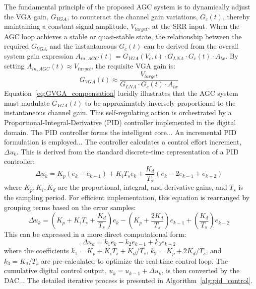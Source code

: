 \documentclass[journal]{IEEEtran}
\begin{document}
The fundamental principle of the proposed AGC system is to dynamically adjust the VGA gain, $G_{VGA}$, to counteract the channel gain variations, $G_c(t)$, thereby maintaining a constant signal amplitude, $V_{target}$, at the SRR input. When the AGC loop achieves a stable or quasi-stable state, the relationship between the required $G_{VGA}$ and the instantaneous $G_c(t)$ can be derived from the overall system gain expression $A_{in,AGC}(t) = G_{VGA}(V_c,t) \cdot G_{LNA} \cdot G_c(t) \cdot A_{tx}$. By setting $A_{in,AGC}(t) \approx V_{target}$, the requisite VGA gain is:
\begin{equation}
    G_{VGA}(t) \approx \frac{V_{target}}{G_{LNA} \cdot G_c(t) \cdot A_{tx}}
    \label{eq:GVGA_compensation}
\end{equation}
Equation~\eqref{eq:GVGA_compensation} lucidly illustrates that the AGC system must modulate $G_{VGA}(t)$ to be approximately inversely proportional to the instantaneous channel gain. This self-regulating action is orchestrated by a Proportional-Integral-Derivative (PID) controller implemented in the digital domain.
The PID controller forms the intelligent core... An incremental PID formulation is employed... The controller calculates a control effort increment, $\Delta u_k$. This is derived from the standard discrete-time representation of a PID controller:
\begin{equation}
    \Delta u_k = K_p (e_k - e_{k-1}) + K_i T_s e_k + \frac{K_d}{T_s} (e_k - 2e_{k-1} + e_{k-2})
    \label{eq:PID_standard_discrete}
\end{equation}
where $K_p, K_i, K_d$ are the proportional, integral, and derivative gains, and $T_s$ is the sampling period. For efficient implementation, this equation is rearranged by grouping terms based on the error samples:
\begin{equation}
    \Delta u_k = (K_p + K_i T_s + \frac{K_d}{T_s}) e_k - (K_p + \frac{2K_d}{T_s}) e_{k-1} + (\frac{K_d}{T_s}) e_{k-2}
    \label{eq:PID_rearranged}
\end{equation}
This can be expressed in a more direct computational form:
\begin{equation}
    \Delta u_k = k_1 e_k - k_2 e_{k-1} + k_3 e_{k-2}
    \label{eq:PID_computational_form}
\end{equation}
where the coefficients $k_1 = K_p + K_i T_s + K_d/T_s$, $k_2 = K_p + 2K_d/T_s$, and $k_3 = K_d/T_s$ are pre-calculated to optimize the real-time control loop. The cumulative digital control output, $u_k = u_{k-1} + \Delta u_k$, is then converted by the DAC... The detailed iterative process is presented in Algorithm~\ref{alg:pid_control}.
\end{document}
